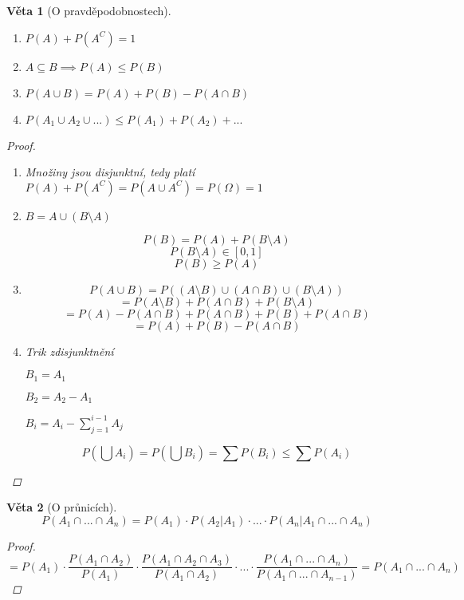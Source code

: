 \documentclass[10pt,a4paper]{article}
\theoremstyle{plain}
\newtheorem{veta}{Věta}
\theoremstyle{definition}
\begin{document}
\begin{veta}[O pravděpodobnostech] \ 


\begin{enumerate}
\item $P(A) + P(A^C) = 1$
\item $A \subseteq B \implies P(A) \leq P(B)$
\item $P(A \cup B) = P(A) + P(B) - P(A \cap B)$
\item $P(A_1 \cup A_2 \cup ...) \leq P(A_1) + P(A_2) + ...$
\end{enumerate}

\begin{proof}
\begin{enumerate}
\item Množiny jsou disjunktní, tedy platí $P(A) + P(A^C) = P(A \cup A^C) = P(\Omega) = 1$
\item $B = A \cup (B \setminus A)$

\[ P(B) = P(A) + P(B \setminus A) \]
\[  P(B \setminus A)  \in [0,1] \]
\[ P(B) \geq P(A) \]

\item \[ P(A \cup B) = P( (A \setminus B) \cup (A \cap B) \cup (B \setminus A))\]
\[ = P(A \setminus B) +  P(A \cap B) + P(B \setminus A)\]
\[ = P(A) -  P(A \cap B)+  P(A \cap B) + P(B) +  P(A \cap B)\]
\[ = P(A) + P(B) - P(A \cap B)  \]

\item Trik zdisjunktnění

$B_1 = A_1$

$B_2 = A_2 - A_1$

$B_i = A_i - \sum_{j=1}^{i-1} A_j$

\[ P(\bigcup A_i) = P(\bigcup B_i) = \sum P(B_i) \leq \sum P(A_i)\]

\end{enumerate}
\end{proof}

\end{veta}

\begin{veta}[O průnicích]
\[ P(A_1 \cap ... \cap A_n) = P(A_1) \cdot P(A_2|A_1) \cdot ... \cdot P(A_n|A_1 \cap ... \cap A_n) \]
\begin{proof}
\[ = P(A_1) \cdot \frac{P(A_1 \cap A_2)}{P(A_1)} \cdot \frac{P(A_1 \cap A_2 \cap A_3)}{P(A_1 \cap A_2)} \cdot ... \cdot 
\frac{P(A_1 \cap ... \cap A_n)}{P(A_1 \cap ... \cap A_{n-1})} = P(A_1 \cap ... \cap A_n) \]
\end{proof}
\end{veta}
\end{document}
